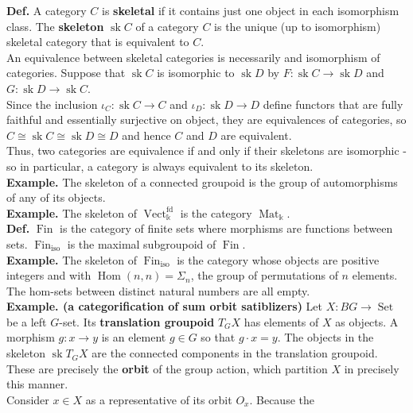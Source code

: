 \documentclass[a4paper]{article}
\theoremstyle{plain}%
\theoremstyle{definition}
\theoremstyle{remark}
\DeclareMathOperator{\Hom}{Hom}
\DeclareMathOperator{\sk}{sk}
\DeclareMathOperator{\Vect}{Vect}
\DeclareMathOperator{\Set}{Set}
\DeclareMathOperator{\Mat}{Mat}
\DeclareMathOperator{\Fin}{Fin}
\begin{document}
\textbf{Def.} A category $C$ is \textbf{skeletal} if it contains just one
object in each isomorphism class. The \textbf{skeleton} 
$\sk C$ of a category $C$ is the unique (up to isomorphism) skeletal category
that is equivalent to $C$.\\
\linebreak
An equivalence between skeletal categories is necessarily and isomorphism of
categories. Suppose that $\sk C $ is isomorphic to $\sk D$ by $F  \colon
\sk C \to \sk D$ and $G  \colon \sk D \to \sk C$.\\
Since the inclusion  $\iota_C  \colon \sk C \to C$ and
$\iota_D  \colon \sk D \to D$ define functors that are fully faithful and essentially surjective on
object, they are equivalences of categories, so
$C \cong \sk C \cong \sk D \cong D$ and hence $C$ and $D$ are equivalent.\\
Thus, two categories are equivalence if and only if their skeletons are
isomorphic - so in particular, a category is always equivalent to its skeleton.\\
\linebreak
\textbf{Example.} The skeleton of a connected groupoid is the group of
automorphisms of any of its objects.\\
\textbf{Example.} The skeleton of $\Vect_{\Bbbk}^{\text{fd}}$ is the
category $\Mat_{\Bbbk}$.\\
\textbf{Def.} $\Fin$ is the category of finite sets where morphisms are
functions between sets. $\Fin_{\text{iso}}$ is the maximal subgroupoid of
$\Fin$.\\
\linebreak
\textbf{Example.} The skeleton of $\Fin_{\text{iso}}$ is the category whose
objects are positive integers and with $\Hom (n,n) = \Sigma_n$, the group of
permutations of $n$ elements. The hom-sets between distinct natural numbers are
all empty.\\
\linebreak
\textbf{Example. (a categorification of sum orbit satiblizers)} Let $X  \colon
BG \to \Set$ be a left $G$-set. Its \textbf{translation groupoid} 
$T_G X$ has elements of $X$ as objects. A morphism $g  \colon x \to y$ is an
element $g \in G$ so that $g \cdot x = y$. The objects in the skeleton
$\sk T_G X$ are the connected components in the translation groupoid. These are
precisely the \textbf{orbit} of the group action, which partition $X$ in
precisely this manner.\\
\linebreak
Consider $x \in X$ as a representative of its orbit $O_x$. Because the
\end{document}
